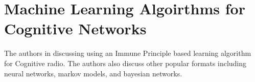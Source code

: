 \section{Machine Learning Algoirthms for Cognitive Networks}

The authors in \cite{6880179} discussing using an Immune Principle based learning algorithm for Cognitive radio. The authors also discuss other popular formats
including neural networks, markov models, and bayesian networks. 
